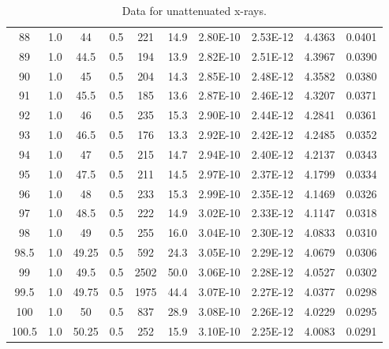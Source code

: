 \documentclass[justified]{tufte-book}
\begin{document}
\begin{table}[ht]
\begin{tabular}{cccccccccc}
88          & 1.0   & 44         & 0.5           & 221     & 14.9       & 2.80E-10    & 2.53E-12       & 4.4363    & 0.0401       \\
89          & 1.0   & 44.5       & 0.5           & 194     & 13.9       & 2.82E-10    & 2.51E-12       & 4.3967    & 0.0390       \\
90          & 1.0   & 45         & 0.5           & 204     & 14.3       & 2.85E-10    & 2.48E-12       & 4.3582    & 0.0380       \\
91          & 1.0   & 45.5       & 0.5           & 185     & 13.6       & 2.87E-10    & 2.46E-12       & 4.3207    & 0.0371       \\
92          & 1.0   & 46         & 0.5           & 235     & 15.3       & 2.90E-10    & 2.44E-12       & 4.2841    & 0.0361       \\
93          & 1.0   & 46.5       & 0.5           & 176     & 13.3       & 2.92E-10    & 2.42E-12       & 4.2485    & 0.0352       \\
94          & 1.0   & 47         & 0.5           & 215     & 14.7       & 2.94E-10    & 2.40E-12       & 4.2137    & 0.0343       \\
95          & 1.0   & 47.5       & 0.5           & 211     & 14.5       & 2.97E-10    & 2.37E-12       & 4.1799    & 0.0334       \\
96          & 1.0   & 48         & 0.5           & 233     & 15.3       & 2.99E-10    & 2.35E-12       & 4.1469    & 0.0326       \\
97          & 1.0   & 48.5       & 0.5           & 222     & 14.9       & 3.02E-10    & 2.33E-12       & 4.1147    & 0.0318       \\
98          & 1.0   & 49         & 0.5           & 255     & 16.0       & 3.04E-10    & 2.30E-12       & 4.0833    & 0.0310       \\
98.5        & 1.0   & 49.25      & 0.5           & 592     & 24.3       & 3.05E-10    & 2.29E-12       & 4.0679    & 0.0306       \\
99          & 1.0   & 49.5       & 0.5           & 2502    & 50.0       & 3.06E-10    & 2.28E-12       & 4.0527    & 0.0302       \\
99.5        & 1.0   & 49.75      & 0.5           & 1975    & 44.4       & 3.07E-10    & 2.27E-12       & 4.0377    & 0.0298       \\
100         & 1.0   & 50         & 0.5           & 837     & 28.9       & 3.08E-10    & 2.26E-12       & 4.0229    & 0.0295       \\
100.5       & 1.0   & 50.25      & 0.5           & 252     & 15.9       & 3.10E-10    & 2.25E-12       & 4.0083    & 0.0291       \\
\end{tabular}
\caption{Data for unattenuated x-rays.}
\label{tab:xrcg2}
\end{table}
\end{document}
